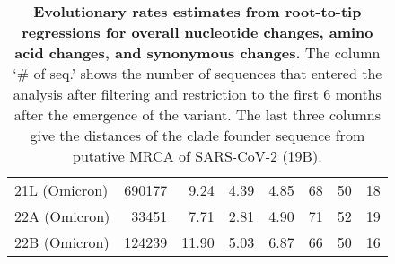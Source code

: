 \documentclass[aps,rmp, twocolumn]{revtex4}
\begin{document}
\begin{table*}
\begin{tabular}{l|rrrrrrr}
    21L (Omicron) & 690177 & 9.24 &     4.39 &      4.85 &       68 &      50 &       18 \\
    22A (Omicron) & 33451 & 7.71 &     2.81 &      4.90 &       71 &      52 &       19 \\
    22B (Omicron) & 124239 & 11.90 &     5.03 &      6.87 &       66 &      50 &       16 \\
           \hline
    \end{tabular}
\caption{{\bf Evolutionary rates estimates from root-to-tip regressions for overall nucleotide changes, amino acid changes, and synonymous changes.}
The column `\# of seq.' shows the number of sequences that entered the analysis after filtering and restriction to the first 6 months after the emergence of the variant.
The last three columns give the distances of the clade founder sequence from putative MRCA of SARS-CoV-2 (19B).
\label{tab:rates}}
\end{table*}

\clearpage
\appendix

\clearpage
\onecolumngrid

% 
\end{document}
